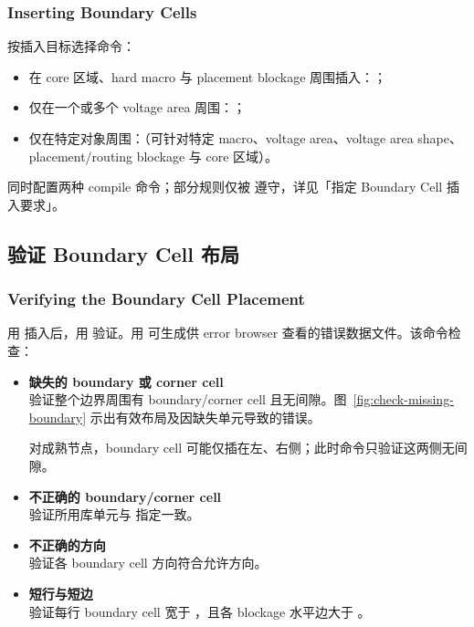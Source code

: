 \subsubsection*{Inserting Boundary Cells}

按插入目标选择命令：
\begin{itemize}
  \item 在 core 区域、hard macro 与 placement blockage 周围插入：；
  \item 仅在一个或多个 voltage area 周围：；
  \item 仅在特定对象周围：（可针对特定 macro、voltage area、voltage area shape、placement/routing blockage 与 core 区域）。
\end{itemize}

 同时配置两种 compile 命令；部分规则仅被  遵守，详见「指定 Boundary Cell 插入要求」。

\subsection{验证 Boundary Cell 布局}
\subsubsection*{Verifying the Boundary Cell Placement}

用  插入后，用  验证。用  可生成供 error browser 查看的错误数据文件。该命令检查：
\begin{itemize}
  \item \textbf{缺失的 boundary 或 corner cell}\\
        验证整个边界周围有 boundary/corner cell 且无间隙。图~\ref{fig:check-missing-boundary} 示出有效布局及因缺失单元导致的错误。
\begin{noteBox}
对成熟节点，boundary cell 可能仅插在左、右侧；此时命令只验证这两侧无间隙。
\end{noteBox}
  \item \textbf{不正确的 boundary/corner cell}\\
        验证所用库单元与  指定一致。
  \item \textbf{不正确的方向}\\
        验证各 boundary cell 方向符合允许方向。
  \item \textbf{短行与短边}\\
        验证每行 boundary cell 宽于 ，且各 blockage 水平边大于 。
\end{itemize}

